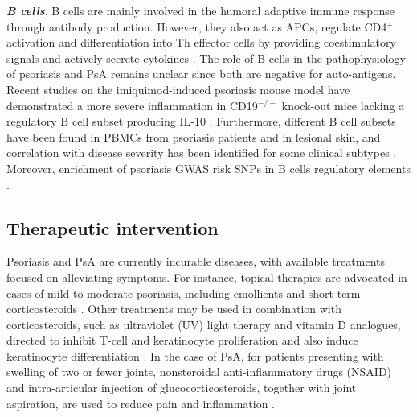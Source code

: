 %
%

\textbf{\textit{B cells}}. B cells are mainly involved in the humoral adaptive immune response through antibody production. However, they also act as APCs, regulate CD4$^+$ activation and differentiation into Th effector cells by providing coestimulatory signals and actively secrete cytokines \parencite{Bouaziz2007,Constant1995,Harris2000,Linton2003}. The role of B cells in the pathophysiology of psoriasis and PsA remains unclear since both are negative for auto-antigens. Recent studies on the imiquimod-induced psoriasis mouse model have demonstrated a more severe inflammation in CD19$^{-/-}$ knock-out mice lacking a regulatory B cell subset producing IL-10 \parencite{Yanaba2013,Alrefai2016}. Furthermore, different B cell subsets have been found in PBMCs from psoriasis patients and in lesional skin, and correlation with disease severity has been identified for some clinical subtypes \parencite{Lu2016}. Moreover, enrichment of psoriasis GWAS risk SNPs in B cells regulatory elements \parencite{Farh2015, Patrick2018}.





\subsection{Therapeutic intervention}
Psoriasis and PsA are currently incurable diseases, with available treatments focused on alleviating symptoms. For instance, topical therapies are advocated in cases of mild-to-moderate psoriasis, including emollients and short-term corticosteroids \parencite{Menter2009}. Other treatments may be used in combination with corticosteroids, such as ultraviolet (UV) light therapy and vitamin D analogues, directed to inhibit T-cell and keratinocyte proliferation and also induce keratinocyte differentiation \parencite{Rizova2001}. In the case of PsA, for patients presenting with swelling of two or fewer joints, nonsteroidal anti-inflammatory drugs (NSAID) and intra-articular injection of glucocorticosteroids, together with joint aspiration, are used to reduce pain and inflammation \parencite{Coates2016}. 

